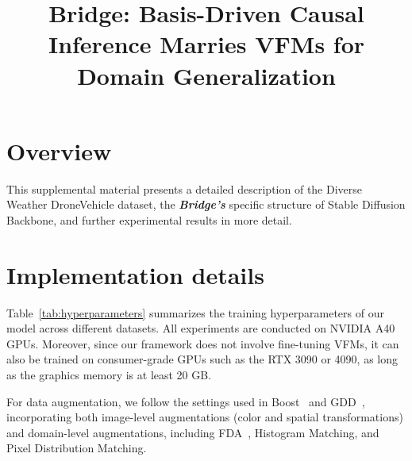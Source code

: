 \documentclass[10pt,twocolumn,letterpaper]{article}
\title{
Bridge: Basis-Driven Causal Inference Marries VFMs for Domain Generalization
\vspace{0.5em}
}
\theoremstyle{plain}
\theoremstyle{definition}
\theoremstyle{remark}
\begin{document}
                \maketitlesupplementary


\hypersetup{linkbordercolor=black, linkcolor=black}

\renewcommand{\thesection}{\Alph{section}} 
\setcounter{section}{0}


\setlength{\cftbeforesecskip}{0.5em}


\localtableofcontents                      

\hypersetup{linkbordercolor=blue,linkcolor=blue}


\section{Overview}
This supplemental material presents a detailed description of the Diverse Weather DroneVehicle dataset, the \textbf{\textit{Bridge’s}} specific structure of Stable Diffusion Backbone, and further experimental results in more detail.



\section{Implementation details}


Table~\ref{tab:hyperparameters} summarizes the training hyperparameters of our model across different datasets. All experiments are conducted on NVIDIA A40 GPUs. Moreover, since our framework does not involve fine-tuning VFMs, it can also be trained on consumer-grade GPUs such as the RTX 3090 or 4090, as long as the graphics memory is at least 20 GB.

For data augmentation, we follow the settings used in Boost~\cite{he2025boosting} and GDD~\cite{he2025generalized}, incorporating both image-level augmentations (color and spatial transformations) and domain-level augmentations, including FDA~\cite{yang2020fda}, Histogram Matching, and Pixel Distribution Matching.
\end{document}
